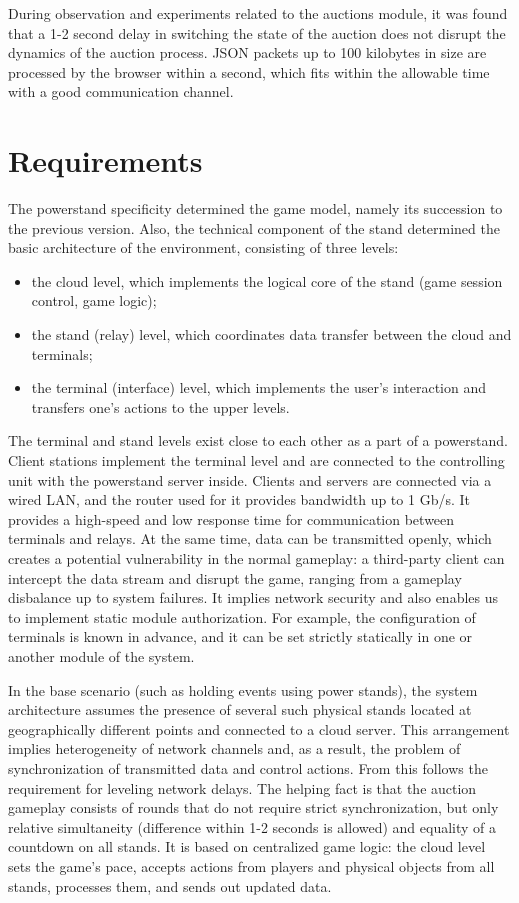 \documentclass[
]{ceurart}
\begin{document}
During observation and experiments related to the auctions module, it was found that a 1-2 second delay in switching the state of the auction does not disrupt the dynamics of the auction process. JSON packets up to 100 kilobytes in size are processed by the browser within a second, which fits within the allowable time with a good communication channel.


\section{Requirements}
\label{sec:reqs}


The powerstand specificity determined the game model, namely its succession to the previous version. Also, the technical component of the stand determined the basic architecture of the environment, consisting of three levels:
\begin{itemize}
\item the cloud level, which implements the logical core of the stand (game session control, game logic);
\item  the stand (relay) level, which coordinates data transfer between the cloud and terminals;
\item  the terminal (interface) level, which implements the user’s interaction and transfers one's actions to the upper levels.
\end{itemize}

The terminal and stand levels exist close to each other as a part of a powerstand. Client stations implement the terminal level and are connected to the controlling unit with the powerstand server inside. Clients and servers are connected via a wired LAN, and the router used for it provides bandwidth up to 1 Gb/s. It provides a high-speed and low response time for communication between terminals and relays. At the same time, data can be transmitted openly, which creates a potential vulnerability in the normal gameplay: a third-party client can intercept the data stream and disrupt the game, ranging from a gameplay disbalance up to system failures. It implies network security and also enables us to implement static module authorization. For example, the configuration of terminals is known in advance, and it can be set strictly statically in one or another module of the system.

In the base scenario (such as holding events using power stands), the system architecture assumes the presence of several such physical stands located at geographically different points and connected to a cloud server. This arrangement implies heterogeneity of network channels and, as a result, the problem of synchronization of transmitted data and control actions. From this follows the requirement for leveling network delays. The helping fact is that the auction gameplay consists of rounds that do not require strict synchronization, but only relative simultaneity (difference within 1-2 seconds is allowed) and equality of a countdown on all stands. It is based on centralized game logic: the cloud level sets the game’s pace, accepts actions from players and physical objects from all stands, processes them, and sends out updated data.
\end{document}
